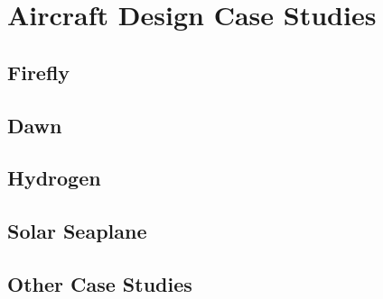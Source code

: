 
\chapter{Aircraft Design Case Studies}


\section{Firefly} %

\section{Dawn} %

\section{Hydrogen} %

\section{Solar Seaplane} %

\section{Other Case Studies} %
